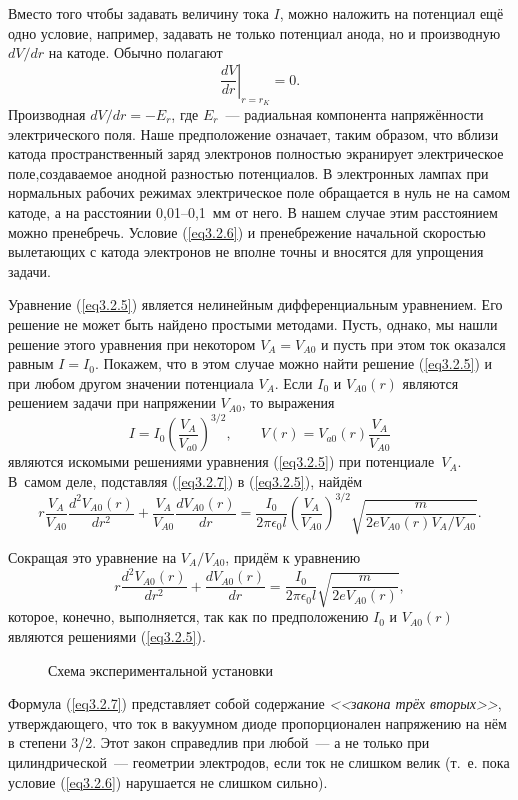 Вместо того чтобы задавать величину тока $I$, можно наложить на потенциал ещё одно условие, например, задавать не только потенциал анода, но и производную $dV/dr$ на катоде. Обычно полагают
\begin{equation}
\left.\frac{dV}{dr}\right|_{r=r_K}=0.
\label{eq3.2.6}
\end{equation}
Производная $dV/dr=-E_r$, где $E_r$~--- радиальная компонента напряжённости электрического поля. Наше предположение
означает, таким образом, что вблизи катода пространственный заряд электронов полностью экранирует электрическое поле,создаваемое анодной разностью потенциалов. В электронных лампах при нормальных рабочих режимах электрическое поле обращается в нуль не на самом катоде, а на расстоянии 0,01--0,1~мм от него. В нашем случае этим расстоянием можно пренебречь. Условие (\ref{eq3.2.6}) и пренебрежение начальной скоростью вылетающих с катода электронов не вполне точны и вносятся для упрощения задачи.

Уравнение (\ref{eq3.2.5}) является нелинейным дифференциальным уравнением. Его решение не может быть найдено простыми методами. Пусть, однако, мы нашли решение этого уравнения при некотором $V_A=V_{A0}$ и пусть при этом ток оказался равным $I=I_0$. Покажем, что в этом случае можно найти решение (\ref{eq3.2.5}) и при любом другом значении потенциала $V_A$. Если $I_0$ и $V_{A0}(r)$ являются решением задачи при напряжении $V_{A0}$, то выражения
\begin{equation}
I=I_0\left(\frac{V_A}{V_{a0}}\right)^{3/2},\qquad V(r)=V_{a0}(r)\frac{V_A}{V_{A0}}
\label{eq3.2.7}
\end{equation}
являются искомыми решениями уравнения (\ref{eq3.2.5}) при потенциале~$V_A$. В~самом деле, подставляя (\ref{eq3.2.7}) в (\ref{eq3.2.5}), найдём
$$
r\frac{V_A}{V_{A0}} \frac{d^2V_{A0}(r)}{dr^2}+\frac{V_A}{V_{A0}} \frac{dV_{A0}(r)}{dr}=
\frac{I_0}{2\pi\epsilon_0l} \left( \frac{V_A}{V_{A0}} \right)^{3/2}
\sqrt{ \frac{m}{2eV_{A0}(r )V_A/V_{A0}}}.
$$

Сокращая это уравнение на $V_A/V_{A0}$, придём к уравнению
$$
r\frac{d^2V_{A0}(r)}{dr^2}+ \frac{dV_{A0}(r)}{dr}=\frac{I_0}{2\pi\epsilon_0l}\sqrt{\frac{m}{2eV_{A0}(r)}},
$$
которое, конечно, выполняется, так как по предположению $I_0$ и $V_{A0}(r)$ являются решениями (\ref{eq3.2.5}).

\begin{figure}
\caption{Схема экспериментальной установки}
\label{fig3.2.2}
\end{figure}

Формула (\ref{eq3.2.7}) представляет собой содержание {\em<<закона трёх вторых>>}, утверждающего, что ток в вакуумном диоде пропорционален напряжению на нём в степени 3/2. Этот закон справедлив при любой~--- а не только при цилиндрической~---
геометрии электродов, если ток не слишком велик (т.~е. пока условие (\ref{eq3.2.6}) нарушается не слишком сильно).

